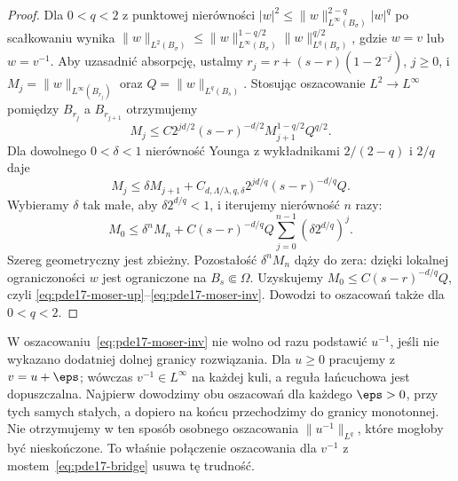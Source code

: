 \begin{proof}
Dla $0<q<2$ z punktowej nierówności
$|w|^2\le\|w\|_{L^\infty(B_\sigma)}^{2-q}|w|^q$
po scałkowaniu wynika
$\|w\|_{L^2(B_\sigma)}\le
\|w\|_{L^\infty(B_\sigma)}^{1-q/2}
\|w\|_{L^q(B_\sigma)}^{q/2}$,
gdzie $w=v$ lub $w=v^{-1}$. Aby uzasadnić absorpcję,
ustalmy $r_j=r+(s-r)(1-2^{-j})$, $j\ge0$, i
$M_j=\|w\|_{L^\infty(B_{r_j})}$ oraz
$Q=\|w\|_{L^q(B_s)}$. Stosując oszacowanie $L^2\to
L^\infty$ pomiędzy $B_{r_j}$ a $B_{r_{j+1}}$
otrzymujemy
\[
 M_j\le C2^{jd/2}(s-r)^{-d/2}M_{j+1}^{1-q/2}Q^{q/2}.
\]
Dla dowolnego $0<\delta<1$ nierówność Younga z wykładnikami
$2/(2-q)$ i $2/q$ daje
\[
 M_j\le\delta M_{j+1}
 +C_{d,\Lambda/\lambda,q,\delta}2^{jd/q}(s-r)^{-d/q}Q.
\]
Wybieramy $\delta$ tak małe, aby $\delta2^{d/q}<1$,
i iterujemy nierówność $n$ razy:
\[
 M_0\le\delta^n M_n+
 C(s-r)^{-d/q}Q\sum_{j=0}^{n-1}(\delta2^{d/q})^j.
\]
Szereg geometryczny jest zbieżny. Pozostałość
$\delta^nM_n$ dąży do zera: dzięki lokalnej ograniczoności
$w$ jest ograniczone na $B_s\Subset\Omega$. Uzyskujemy
$M_0\le C(s-r)^{-d/q}Q$, czyli
\eqref{eq:pde17-moser-up}--\eqref{eq:pde17-moser-inv}.
Dowodzi to oszacowań także dla $0<q<2$.
\end{proof}


\begin{uwaga}
\label{rem:pde17-negpower}
W oszacowaniu~\eqref{eq:pde17-moser-inv} nie wolno od razu
podstawić $u^{-1}$, jeśli nie wykazano dodatniej dolnej granicy
rozwiązania. Dla $u\ge0$ pracujemy z $v=u+\eps$;
wówczas $v^{-1}\in L^\infty$ na każdej kuli, a reguła
łańcuchowa jest dopuszczalna. Najpierw dowodzimy obu
oszacowań dla każdego $\eps>0$, przy tych samych stałych,
a dopiero na końcu przechodzimy do granicy monotonnej.
Nie otrzymujemy w ten sposób osobnego oszacowania
$\|u^{-1}\|_{L^q}$, które mogłoby być nieskończone.
To właśnie połączenie oszacowania dla $v^{-1}$
z mostem~\eqref{eq:pde17-bridge} usuwa tę trudność.
\end{uwaga}

